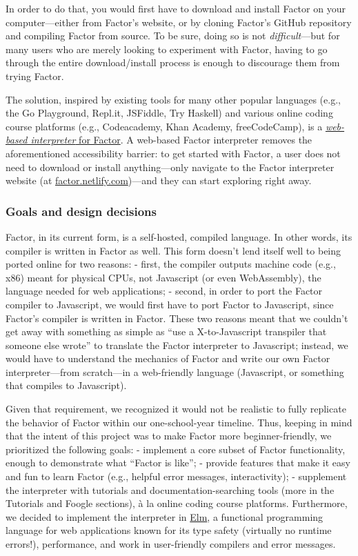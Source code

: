 \documentclass[
]{article}
\begin{document}
In order to do that, you would first have to download and install Factor
on your computer---either from Factor's website, or by cloning Factor's
GitHub repository and compiling Factor from source. To be sure, doing so
is not \emph{difficult}---but for many users who are merely looking to
experiment with Factor, having to go through the entire download/install
process is enough to discourage them from trying Factor.

The solution, inspired by existing tools for many other popular
languages (e.g., the Go Playground, Repl.it, JSFiddle, Try Haskell) and
various online coding course platforms (e.g., Codeacademy, Khan Academy,
freeCodeCamp), is a \href{https://factor.netlify.com}{\emph{web-based
interpreter} for Factor}. A web-based Factor interpreter removes the
aforementioned accessibility barrier: to get started with Factor, a user
does not need to download or install anything---only navigate to the
Factor interpreter website (at
\href{https://factor.netlify.com}{factor.netlify.com})---and they can
start exploring right away.

\hypertarget{goals-and-design-decisions}{%
\subsubsection{Goals and design
decisions}\label{goals-and-design-decisions}}

Factor, in its current form, is a self-hosted, compiled language. In
other words, its compiler is written in Factor as well. This form
doesn't lend itself well to being ported online for two reasons: -
first, the compiler outputs machine code (e.g., x86) meant for physical
CPUs, not Javascript (or even WebAssembly), the language needed for web
applications; - second, in order to port the Factor compiler to
Javascript, we would first have to port Factor to Javascript, since
Factor's compiler is written in Factor. These two reasons meant that we
couldn't get away with something as simple as ``use a X-to-Javascript
transpiler that someone else wrote'' to translate the Factor interpreter
to Javascript; instead, we would have to understand the mechanics of
Factor and write our own Factor interpreter---from scratch---in a
web-friendly language (Javascript, or something that compiles to
Javascript).

Given that requirement, we recognized it would not be realistic to fully
replicate the behavior of Factor within our one-school-year timeline.
Thus, keeping in mind that the intent of this project was to make Factor
more beginner-friendly, we prioritized the following goals: - implement
a core subset of Factor functionality, enough to demonstrate what
``Factor is like''; - provide features that make it easy and fun to
learn Factor (e.g., helpful error messages, interactivity); - supplement
the interpreter with tutorials and documentation-searching tools (more
in the Tutorials and Foogle sections), à la online coding course
platforms. Furthermore, we decided to implement the interpreter in
\href{https://elm-lang.org/}{Elm}, a functional programming language for
web applications known for its type safety (virtually no runtime
errors!), performance, and work in user-friendly compilers and error
messages.
\end{document}
